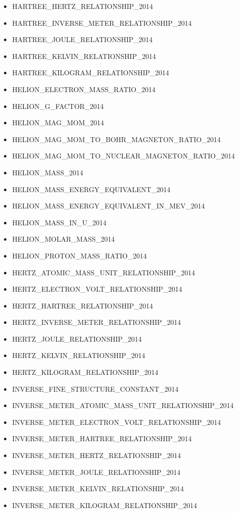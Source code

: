 \begin{itemize}
\item HARTREE\_HERTZ\_RELATIONSHIP\_2014
\item HARTREE\_INVERSE\_METER\_RELATIONSHIP\_2014
\item HARTREE\_JOULE\_RELATIONSHIP\_2014
\item HARTREE\_KELVIN\_RELATIONSHIP\_2014
\item HARTREE\_KILOGRAM\_RELATIONSHIP\_2014
\item HELION\_ELECTRON\_MASS\_RATIO\_2014
\item HELION\_G\_FACTOR\_2014
\item HELION\_MAG\_MOM\_2014
\item HELION\_MAG\_MOM\_TO\_BOHR\_MAGNETON\_RATIO\_2014
\item HELION\_MAG\_MOM\_TO\_NUCLEAR\_MAGNETON\_RATIO\_2014
\item HELION\_MASS\_2014
\item HELION\_MASS\_ENERGY\_EQUIVALENT\_2014
\item HELION\_MASS\_ENERGY\_EQUIVALENT\_IN\_MEV\_2014
\item HELION\_MASS\_IN\_U\_2014
\item HELION\_MOLAR\_MASS\_2014
\item HELION\_PROTON\_MASS\_RATIO\_2014
\item HERTZ\_ATOMIC\_MASS\_UNIT\_RELATIONSHIP\_2014
\item HERTZ\_ELECTRON\_VOLT\_RELATIONSHIP\_2014
\item HERTZ\_HARTREE\_RELATIONSHIP\_2014
\item HERTZ\_INVERSE\_METER\_RELATIONSHIP\_2014
\item HERTZ\_JOULE\_RELATIONSHIP\_2014
\item HERTZ\_KELVIN\_RELATIONSHIP\_2014
\item HERTZ\_KILOGRAM\_RELATIONSHIP\_2014
\item INVERSE\_FINE\_STRUCTURE\_CONSTANT\_2014
\item INVERSE\_METER\_ATOMIC\_MASS\_UNIT\_RELATIONSHIP\_2014
\item INVERSE\_METER\_ELECTRON\_VOLT\_RELATIONSHIP\_2014
\item INVERSE\_METER\_HARTREE\_RELATIONSHIP\_2014
\item INVERSE\_METER\_HERTZ\_RELATIONSHIP\_2014
\item INVERSE\_METER\_JOULE\_RELATIONSHIP\_2014
\item INVERSE\_METER\_KELVIN\_RELATIONSHIP\_2014
\item INVERSE\_METER\_KILOGRAM\_RELATIONSHIP\_2014

\end{itemize}
